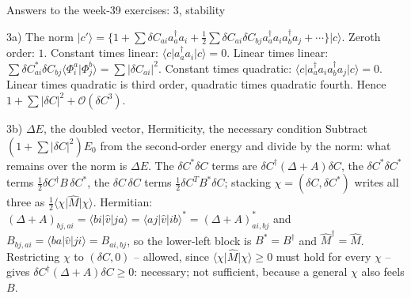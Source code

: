 \documentclass[aspectratio=169,10pt]{beamer}
\newcommand{\ket}[1]{\vert #1\rangle}
\newcommand{\bra}[1]{\langle #1\vert}
\newcommand{\braket}[2]{\langle #1\vert #2\rangle}
\newcommand{\element}[3]{\langle #1\vert #2\vert #3\rangle}
\newcommand{\bigO}{\mathcal{O}}
\begin{document}
\begin{frame}{Answers to the week-39 exercises: 3, stability}
  \footnotesize
  \begin{block}{3a) The norm}
    $\ket{c'}=\{1+\sum\delta C_{ai}a_a^{\dagger}a_i+\frac12\sum\delta C_{ai}\delta C_{bj}a_a^{\dagger}a_ia_b^{\dagger}a_j+\cdots\}\ket c$. Zeroth order: $1$. Constant times linear: $\element{c}{a_a^{\dagger}a_i}{c}=0$. Linear times linear: $\sum\delta C^{*}_{ai}\delta C_{bj}\braket{\Phi_i^a}{\Phi_j^b}=\sum|\delta C_{ai}|^2$. Constant times quadratic: $\element{c}{a_a^{\dagger}a_ia_b^{\dagger}a_j}{c}=0$. Linear times quadratic is third order, quadratic times quadratic fourth. Hence $1+\sum|\delta C|^2+\bigO(\delta C^3)$.
  \end{block}
  \begin{block}{3b) $\Delta E$, the doubled vector, Hermiticity, the necessary condition}
    Subtract $(1+\sum|\delta C|^2)E_0$ from the second-order energy and divide by the norm: what remains over the norm is $\Delta E$. The $\delta C^{*}\delta C$ terms are $\delta C^{\dagger}(\Delta+A)\delta C$, the $\delta C^{*}\delta C^{*}$ terms $\frac12\delta C^{\dagger}B\,\delta C^{*}$, the $\delta C\,\delta C$ terms $\frac12\delta C^{T}B^{*}\delta C$; stacking $\chi=(\delta C,\delta C^{*})$ writes all three as $\frac12\bra\chi\hat M\ket\chi$. Hermitian: $(\Delta+A)_{bj,ai}=\element{bi}{\hat v}{ja}=\element{aj}{\hat v}{ib}^{*}=(\Delta+A)^{*}_{ai,bj}$ and $B_{bj,ai}=\element{ba}{\hat v}{ji}=B_{ai,bj}$, so the lower-left block is $B^{*}=B^{\dagger}$ and $\hat M^{\dagger}=\hat M$. Restricting $\chi$ to $(\delta C,0)$ -- allowed, since $\bra\chi\hat M\ket\chi\ge0$ must hold for every $\chi$ -- gives $\delta C^{\dagger}(\Delta+A)\delta C\ge0$: necessary; not sufficient, because a general $\chi$ also feels $B$.
  \end{block}
\end{frame}
\end{document}
